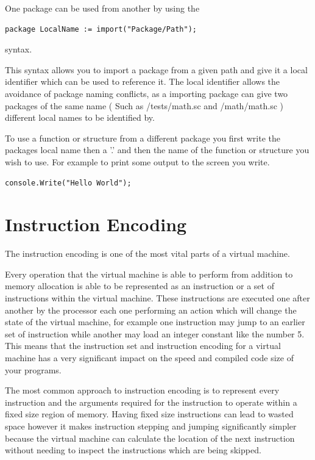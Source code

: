 \documentclass[]{final_report}
\begin{document}
One package can be used from another by using the
\begin{verbatim}
package LocalName := import("Package/Path");
\end{verbatim}
syntax.

This syntax allows you to import a package from a given path and give it a local identifier which can be used to reference it. The local identifier allows the avoidance of package naming conflicts, as a importing package can give two packages of the same name ( Such as /tests/math.sc and /math/math.sc ) different local names to be identified by.

To use a function or structure from a different package you first write the packages local name then a '.' and then the name of the function or structure you wish to use. For example to print some output to the screen you write.

\begin{verbatim}
console.Write("Hello World");
\end{verbatim}

\chapter{Instruction Encoding}

The instruction encoding is one of the most vital parts of a virtual machine.

Every operation that the virtual machine is able to perform from addition to memory allocation is able to be represented as an instruction or a set of instructions within the virtual machine.
These instructions are executed one after another by the processor each one performing an action which will change the state of the virtual machine, for example one instruction may jump to an earlier set of instruction while another may load an integer constant like the number 5.
This means that the instruction set and instruction encoding for a virtual machine has a very significant impact on the speed and compiled code size of your programs.

The most common approach to instruction encoding is to represent every instruction and the arguments required for the instruction to operate within a fixed size region of memory. Having fixed size instructions can lead to wasted space however it makes instruction stepping and jumping significantly simpler because the virtual machine can calculate the location of the next instruction without needing to inspect the instructions which are being skipped.
\end{document}
